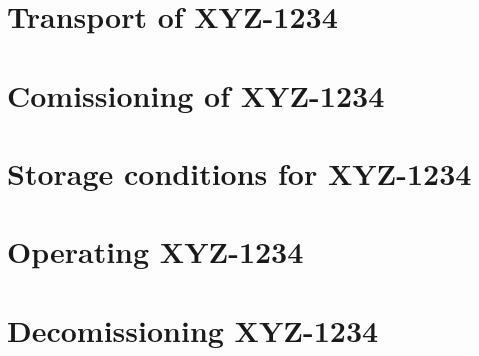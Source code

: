 \documentclass[11pt]{report}
\begin{document}
\newcommand{\productname}{XYZ-1234}
\chapter{Transport of \productname}
\blindtext
\chapter{Comissioning of \productname}
\blindtext
\chapter{Storage conditions for \productname}
\blindtext
\chapter{Operating \productname}
\blindtext
\chapter{Decomissioning \productname}
\end{document}
